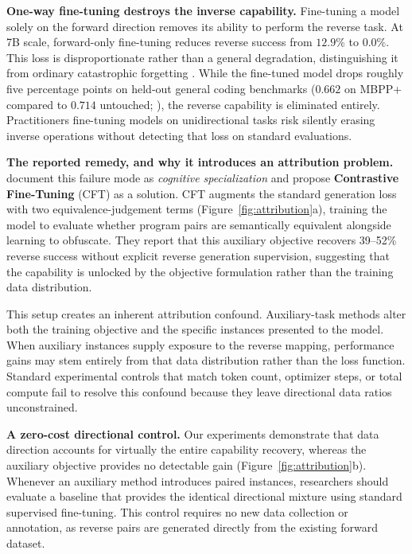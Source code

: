 \documentclass{article}
\begin{document}
\textbf{One-way fine-tuning destroys the inverse capability.} Fine-tuning a model solely on the forward direction removes its ability to perform the reverse task. At 7B scale, forward-only fine-tuning reduces reverse success from $12.9\%$ to $0.0\%$. This loss is disproportionate rather than a general degradation, distinguishing it from ordinary catastrophic forgetting \citep{french1999catastrophic,luo2023empirical}. While the fine-tuned model drops roughly five percentage points on held-out general coding benchmarks ($0.662$ on MBPP+ compared to $0.714$ untouched; \citealp{liu2023evalplus}), the reverse capability is eliminated entirely. Practitioners fine-tuning models on unidirectional tasks risk silently erasing inverse operations without detecting that loss on standard evaluations.



\textbf{The reported remedy, and why it introduces an attribution problem.} \citet{nikiema2025contrastive} document this failure mode as \emph{cognitive specialization} and propose \textbf{Contrastive Fine-Tuning} (CFT) as a solution. CFT augments the standard generation loss with two equivalence-judgement terms (Figure~\ref{fig:attribution}a), training the model to evaluate whether program pairs are semantically equivalent alongside learning to obfuscate. They report that this auxiliary objective recovers 39--52\% reverse success without explicit reverse generation supervision, suggesting that the capability is unlocked by the objective formulation rather than the training data distribution.

This setup creates an inherent attribution confound. Auxiliary-task methods alter both the training objective and the specific instances presented to the model. When auxiliary instances supply exposure to the reverse mapping, performance gains may stem entirely from that data distribution rather than the loss function. Standard experimental controls that match token count, optimizer steps, or total compute fail to resolve this confound because they leave directional data ratios unconstrained.

\textbf{A zero-cost directional control.} Our experiments demonstrate that data direction accounts for virtually the entire capability recovery, whereas the auxiliary objective provides no detectable gain (Figure~\ref{fig:attribution}b). Whenever an auxiliary method introduces paired instances, researchers should evaluate a baseline that provides the identical directional mixture using standard supervised fine-tuning. This control requires no new data collection or annotation, as reverse pairs are generated directly from the existing forward dataset.
\end{document}
